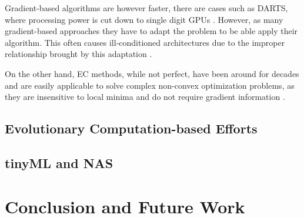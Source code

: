 \documentclass[10pt,        %
               a4paper,     %
               journal,     %
               ]{IEEEtran}
\begin{document}
Gradient-based algorithms are however faster, there are cases such as DARTS, where processing power
is cut down to single digit GPUs \cite{liu2018darts}. However, as many gradient-based approaches they have
to adapt the problem to be able apply their algorithm. This often causes ill-conditioned architectures due to
the improper relationship brought by this adaptation \cite{liu2021survey}.

On the other hand, EC methods, while not perfect, have been around for decades and are easily applicable
to solve complex non-convex optimization problems, as they are insensitive to local minima and do not require
gradient information \cite{liu2021survey}.

\subsection{Evolutionary Computation-based Efforts}

\subsection{tinyML and NAS}

\section{Conclusion and Future Work}

\newpage



%
\end{document}
